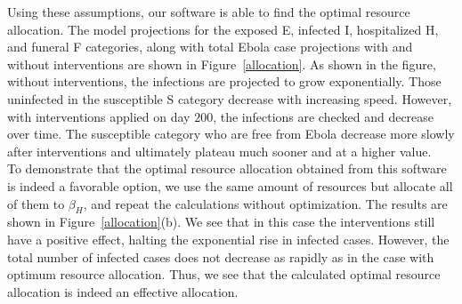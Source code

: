 \documentclass[11pt,letter]{article}
\begin{document}
Using these assumptions, our software is able to find the optimal resource allocation. The model projections for the exposed E, infected I, hospitalized H, and funeral F categories, along with total Ebola case projections with and without interventions are shown in Figure~\ref{allocation}. As shown in the figure, without interventions, the infections are projected to grow exponentially. Those uninfected in the susceptible S category decrease with increasing speed. However, with interventions applied on day $200$, the infections are checked and decrease over time. The susceptible category who are free from Ebola decrease more slowly after interventions and ultimately plateau much sooner and at a higher value.\\

To demonstrate that the optimal resource allocation obtained from this software is indeed a favorable option, we use the same amount of resources but allocate all of them to $\beta_H$, and repeat the calculations without optimization. The results are shown in Figure~\ref{allocation}(b). We see that in this case the interventions still have a positive effect, halting the exponential rise in infected cases. However, the total number of infected cases does not decrease as rapidly as in the case with optimum resource allocation. Thus, we see that the calculated optimal resource allocation is indeed an effective allocation.\\
\end{document}
